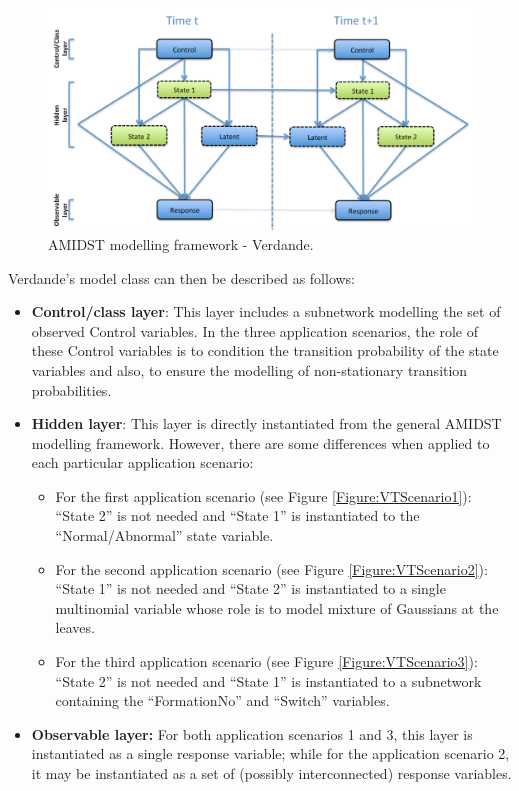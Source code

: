 \begin{figure}[ht!]
\begin{center}
\includegraphics[scale=0.39]{./figures/AMIDSTModelClassVerdande}
\caption{\label{Figure:AMIDSTModelClassVerdande} AMIDST modelling framework - Verdande.}
\end{center}
\end{figure}

Verdande's model class can then be described as follows:

\begin{itemize}
\item \textbf{Control/class layer}:  This layer includes a subnetwork modelling the set of observed Control variables. In the three application scenarios, the role of these Control variables is to condition the transition probability of the state variables and also, to ensure the modelling of non-stationary transition probabilities.  

\item \textbf{Hidden layer}: This layer is directly instantiated from the general AMIDST modelling framework. However, there are some differences when applied to each particular application scenario:

\begin{itemize}
\item For the first application scenario (see Figure \ref{Figure:VTScenario1}):  ``State 2'' is not needed and ``State 1'' is instantiated to the ``Normal/Abnormal'' state variable. 

\item For the second application scenario (see Figure \ref{Figure:VTScenario2}): ``State 1'' is not needed and ``State 2'' is instantiated to a single multinomial variable whose role is to model mixture of Gaussians at the leaves. 

\item For the third application scenario (see Figure \ref{Figure:VTScenario3}): ``State 2'' is not needed and ``State 1'' is instantiated to a subnetwork containing the ``FormationNo'' and ``Switch'' variables.
\end{itemize}

\item \textbf{Observable layer:} For both application scenarios 1 and 3, this layer is instantiated as a single response variable; while for the application scenario 2, it may be instantiated as a set of (possibly interconnected) response variables. 
\end{itemize}

